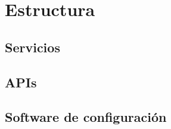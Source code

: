 \section{Estructura}

\subsection{Servicios}
\subsection{APIs}
\subsection{Software de configuración}